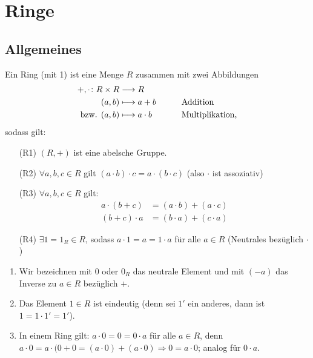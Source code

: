 \documentclass[12pt,a4paper]{scrartcl}
\begin{document}

\section{Ringe}
\subsection{Allgemeines}
\begin{defi} Ein Ring (mit 1) ist eine Menge $R$ zusammen mit zwei Abbildungen
	\begin{alignat*}{2}
		+,\cdot \colon R\times R &\longrightarrow  R &&\quad\\
		(a,b)&\longmapsto a+b \qquad &&\text{Addition}\\
		\text{bzw. }(a,b)&\longmapsto a\cdot b &&\text{Multiplikation,}
	\end{alignat*}
sodass gilt:
\begin{itemize}
	\item[(R1)] $(R,+)$ ist eine abelsche Gruppe.
	\item[(R2)] $\forall a,b,c\in R$ gilt $(a\cdot b)\cdot c = a\cdot (b\cdot c)$ (also $\cdot$ ist assoziativ)
	\item[(R3)] $\forall a,b,c\in R$ gilt:
	\begin{equation*}
		\begin{aligned}
		a\cdot(b+c) &= (a\cdot b)+ (a\cdot c)\\
		(b+c)\cdot a &= (b\cdot a)+(c\cdot a)
		\end{aligned} \tag{Distributivität}
	\end{equation*}
	\item[(R4)] $\exists 1 = 1_R\in R$, sodass $a\cdot 1 = a = 1\cdot a$ für alle $a\in R$ (Neutrales bezüglich $\cdot$)
\end{itemize}
\end{defi}

\begin{bem} \leavevmode
	\begin{enumerate}
		\item Wir bezeichnen mit $0$ oder $0_R$ das neutrale Element und mit $(-a)$ das Inverse zu $a\in R$ bezüglich $+$.
		\item Das Element $1\in R$ ist eindeutig (denn sei $1'$ ein anderes, dann ist $1 = 1\cdot 1' = 1'$).
		\item In einem Ring gilt: $a\cdot 0 = 0 = 0\cdot a$ für alle $a\in R$, denn $a\cdot 0 = a\cdot (0+0 = (a\cdot 0)+(a\cdot 0)\Rightarrow 0 = a\cdot 0$; analog für $0\cdot a$.
	\end{enumerate}
\end{bem}
\end{document}
